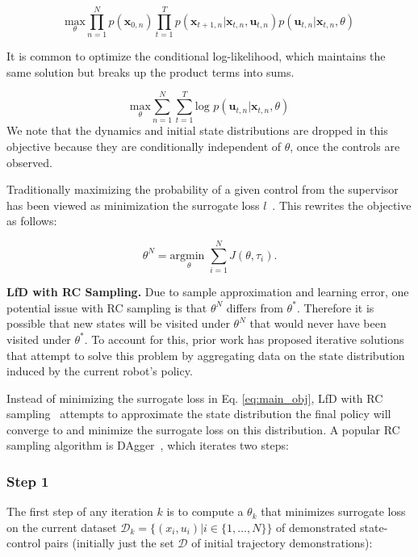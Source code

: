 \documentclass[10pt, conference]{ieeeconf}      %
\newcommand{\bu}{\mathbf{u}}
\newcommand{\bx}{\mathbf{x}}
\newcommand{\nc}{RC }
\begin{document}
$$\underset{\theta}{\mbox{max}} \prod^N_{n=1} p(\bx_{0,n}) \prod^T_{t=1} p(\bx_{t+1,n}|\bx_{t,n},\bu_{t,n})p(\bu_{t,n}|\bx_{t,n},\theta)$$

It is common to optimize the conditional log-likelihood, which maintains the same solution but breaks up the product terms into sums. 

\begin{equation}\label{eq:m_likeli_obj}
\underset{\theta}{\mbox{max}} \sum^N_{n=1}\sum^T_{t=1}\mbox{log }p(\bu_{t,n}|\bx_{t,n},\theta)
\end{equation}
\noindent We note that the dynamics and initial state distributions are dropped in this objective because they are conditionally independent of $\theta$, once the controls are observed. 

Traditionally maximizing the probability of a given control from the supervisor has been viewed as minimization the surrogate loss $l$~\cite{ross2010reduction,ross2010efficient}.
This rewrites the objective as follows: 

\begin{equation}\label{eq:main_obj}
\theta^N = \underset{\theta}{\mbox{argmin }} \sum \limits_{i=1}^N J(\theta, \tau_i).
\end{equation}

\noindent \textbf{LfD with \nc Sampling.}
Due to sample approximation and learning error, one potential issue with \nc sampling is that $\theta^N$ differs from $\theta^*$.
Therefore it is possible that new states will be visited under $\theta^N$ that would never have been visited under $\theta^*$.
To account for this, prior work has proposed iterative solutions~\cite{ross2010reduction} that attempt to solve this problem by aggregating data on the state distribution induced by the current robot's policy.

Instead of  minimizing the surrogate loss in Eq. \ref{eq:main_obj},  LfD with RC sampling~\cite{ross2010reduction,laskeyshiv,he2012imitation} attempts to approximate the state distribution the final policy will converge to and minimize the surrogate loss on this distribution.
A popular RC sampling algorithm is DAgger~\cite{ross2010reduction}, which iterates two steps:

\subsubsection{Step 1}
The first step of any iteration $k$ is to compute a $\theta_k$ that minimizes surrogate loss on the current dataset $\mathcal{D}_k=\{(x_i,u_i)|i\in\{1,\ldots,N\}\}$ of demonstrated state-control pairs (initially just the set $\mathcal{D}$ of initial trajectory demonstrations):
\end{document}
